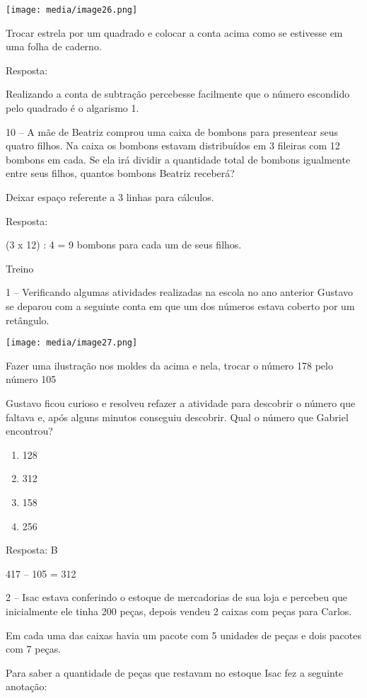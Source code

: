 \texttt{[image: media/image26.png]}

Trocar estrela por um quadrado e colocar a conta acima como se estivesse
em uma folha de caderno.

Resposta:

Realizando a conta de subtração percebesse facilmente que o número
escondido pelo quadrado é o algarismo 1.

10 -- A mãe de Beatriz comprou uma caixa de bombons para presentear seus
quatro filhos. Na caixa os bombons estavam distribuídos em 3 fileiras
com 12 bombons em cada. Se ela irá dividir a quantidade total de bombons
igualmente entre seus filhos, quantos bombons Beatriz receberá?

Deixar espaço referente a 3 linhas para cálculos.

Resposta:

(3 x 12) : 4 = 9 bombons para cada um de seus filhos.

Treino

1 -- Verificando algumas atividades realizadas na escola no ano anterior
Gustavo se deparou com a seguinte conta em que um dos números estava
coberto por um retângulo.

\texttt{[image: media/image27.png]}

Fazer uma ilustração nos moldes da acima e nela, trocar o número 178
pelo número 105

Gustavo ficou curioso e resolveu refazer a atividade para descobrir o
número que faltava e, após alguns minutos conseguiu descobrir. Qual o
número que Gabriel encontrou?

\begin{enumerate}
\def\labelenumi{\alph{enumi})}
\item
  128
\item
  312
\item
  158
\item
  256
\end{enumerate}

Resposta: B

417 -- 105 = 312

2 -- Isac estava conferindo o estoque de mercadorias de sua loja e
percebeu que inicialmente ele tinha 200 peças, depois vendeu 2 caixas
com peças para Carlos.

Em cada uma das caixas havia um pacote com 5 unidades de peças e dois
pacotes com 7 peças.

Para saber a quantidade de peças que restavam no estoque Isac fez a
seguinte anotação:

